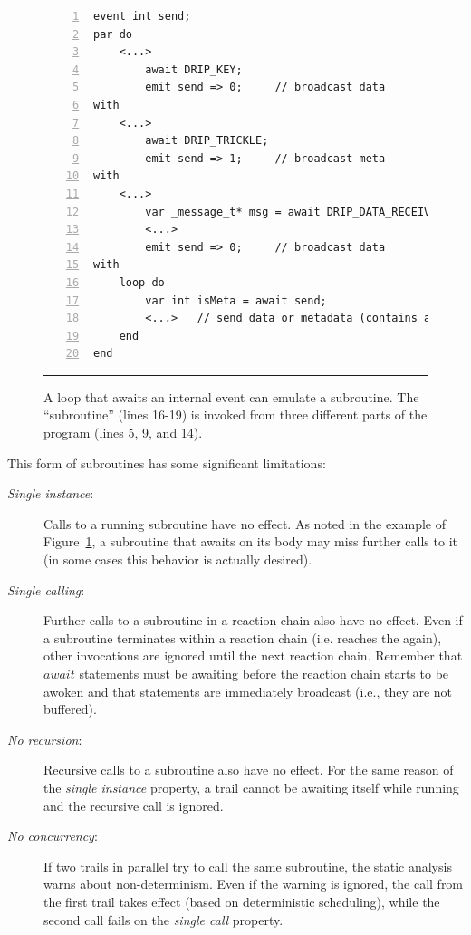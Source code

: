 \begin{figure}[t]
\begin{lstlisting}[numbers=left,xleftmargin=2em]
event int send;
par do
    <...>
        await DRIP_KEY;
        emit send => 0;     // broadcast data
with
    <...>
        await DRIP_TRICKLE;
        emit send => 1;     // broadcast meta
with
    <...>
        var _message_t* msg = await DRIP_DATA_RECEIVE;
        <...>
        emit send => 0;     // broadcast data
with
    loop do
        var int isMeta = await send;
        <...>   // send data or metadata (contains awaits)
    end
end
\end{lstlisting}
\rule{14cm}{0.37pt}
\caption{ A loop that awaits an internal event can emulate a subroutine.  \newline
{\small %
The  ``subroutine'' (lines 16-19) is invoked from three different 
parts of the program (lines 5, 9, and 14).
}%
\label{lst.func}
}
\end{figure}

This form of subroutines has some significant limitations:

\begin{description}
\item[\emph{Single instance}:] Calls to a running subroutine have no effect.
As noted in the example of Figure~\ref{lst.func}, a subroutine that awaits on 
its body may miss further calls to it (in some cases this behavior is actually 
desired).
%
\item[\emph{Single calling}:] Further calls to a subroutine in a reaction chain 
also have no effect.
Even if a subroutine terminates within a reaction chain (i.e. reaches the 
 again), other  invocations are ignored until the next 
reaction chain.
Remember that $await$ statements must be awaiting before the reaction chain 
starts to be awoken and that  statements are immediately broadcast 
(i.e., they are not buffered).
%
\item[\emph{No recursion}:] Recursive calls to a subroutine also have no 
effect.
For the same reason of the \emph{single instance} property, a trail cannot be 
awaiting itself while running and the recursive call is ignored.
%
\item[\emph{No concurrency}:] If two trails in parallel try to call the same 
subroutine, the static analysis warns about non-determinism.
Even if the warning is ignored, the call from the first trail takes effect 
(based on deterministic scheduling), while the second call fails on the 
\emph{single call} property.
\end{description}

